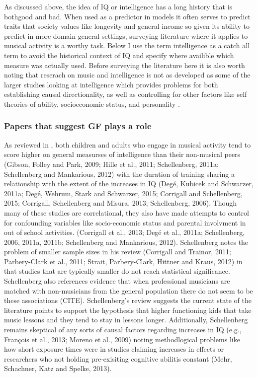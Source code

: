 \documentclass[]{book}
\theoremstyle{definition}
\theoremstyle{definition}
\theoremstyle{definition}
\theoremstyle{remark}
\begin{document}
As discussed above, the idea of IQ or intelligence has a long history
that is bothgood and bad. When used as a predictor in models it often
serves to predict traits that society values like longevity and general
income so given its ability to predict in more domain general settings,
surveying literature where it applies to musical activity is a worthy
task. Below I use the term intelligence as a catch all term to avoid the
historical context of IQ and specify where availible which measure was
actually used. Before surveying the literature here it is also worth
noting that reserach on music and intelligence is not as developed as
some of the larger studies looking at intelligence which provides
problems for both establishing causal directionality, as well as
controlling for other factors like self theories of ability,
socioeconomic status, and personality
\citep{mullensiefenInvestigatingImportanceSelftheories2015}.

\hypertarget{papers-that-suggest-gf-plays-a-role}{%
\subsubsection{Papers that suggest GF plays a
role}\label{papers-that-suggest-gf-plays-a-role}}

As reviewed in \citet{schellenbergMusicNonmusicalAbilities2017}, both
children and adults who engage in musical activity tend to score higher
on general measurses of intelligence than their non-musical peers
(Gibson, Folley and Park, 2009; Hille et al., 2011; Schellenberg, 2011a;
Schellenberg and Mankarious, 2012) with the duration of training sharing
a relationship with the extent of the increases in IQ (Degé, Kubicek and
Schwarzer, 2011a; Degé, Wehrum, Stark and Schwarzer, 2015; Corrigall and
Schellenberg, 2015; Corrigall, Schellenberg and Misura, 2013;
Schellenberg, 2006). Though many of these studies are correlational,
they also have made attempts to control for confounding variables like
socio-economic status and parental involvment in out of school
activities. (Corrigall et al., 2013; Degé et al., 2011a; Schellenberg,
2006, 2011a, 2011b; Schellenberg and Mankarious, 2012). Schellenberg
notes the problem of smaller sample sizes in his review (Corrigall and
Trainor, 2011; Parbery-Clark et al., 2011; Strait, Parbery-Clark,
Hittner and Kraus, 2012) in that studies that are typically smaller do
not reach statistical significance. Schellenberg also references
evidence that when professional musicians are matched with non-musicians
from the general population there do not seem to be these associations
(CITE). Schellenberg's review suggests the current state of the
literature points to support the hypothesis that higher functioning kids
that take music lessons and they tend to stay in lessons longer.
Additionally, Schellenberg remains skeptical of any sorts of causal
factors regarding increases in IQ (e.g., François et al., 2013; Moreno
et al., 2009) noting methodlogical problems like how short exposure
times were in studies claiming increases in effects or researchers who
not holding pre-exisiting cognitive abilitis constant (Mehr, Schachner,
Katz and Spelke, 2013).
\end{document}
